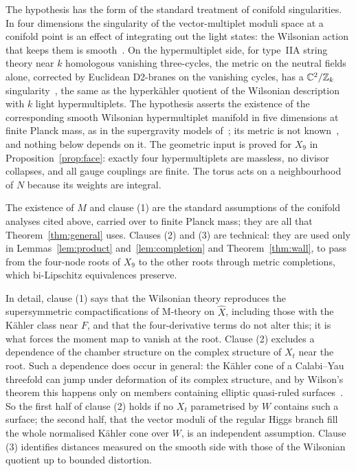 The hypothesis has the form of the standard treatment of conifold singularities. In four
dimensions the singularity of the vector-multiplet moduli space at a conifold point is an
effect of integrating out the light states: the Wilsonian action that keeps them is
smooth~\cite{Strominger:1995Conifold,Greene:1995hu}. On the hypermultiplet side, for type~IIA
string theory near $k$ homologous vanishing three-cycles, the metric on the neutral fields alone,
corrected by Euclidean D2-branes on the vanishing cycles, has a $\mathbb C^2/\mathbb Z_k$
singularity~\cite{OoguriVafa:1996,SeibergShenker:1996}, the same as the hyperk\"ahler quotient of
the Wilsonian description with $k$ light hypermultiplets. The hypothesis asserts the existence
of the corresponding smooth Wilsonian hypermultiplet manifold in five dimensions at finite Planck
mass, as in the supergravity models of~\cite{Mohaupt:2004de}; its metric is not
known~\cite{Mohaupt:2004de}, and nothing below depends on it. The geometric input is proved for $X_9$ in Proposition~\ref{prop:face}: exactly four hypermultiplets are massless, no
divisor collapses, and all gauge couplings are finite. The torus acts on a neighbourhood of $N$
because its weights are integral.

The existence of $M$ and clause (1) are the standard assumptions of the conifold analyses cited
above, carried over to finite Planck mass; they are all that Theorem~\ref{thm:general} uses.
Clauses (2) and (3) are technical: they are used only in Lemmas~\ref{lem:product}
and~\ref{lem:completion} and Theorem~\ref{thm:wall}, to pass from the four-node roots of $X_9$ to
the other roots through metric completions, which bi-Lipschitz equivalences preserve.

In detail, clause (1) says that the Wilsonian theory reproduces the
supersymmetric compactifications of M-theory on $\widehat X$, including those with the K\"ahler
class near $F$, and that the four-derivative terms do not alter this; it is what forces the
moment map to vanish at the root. Clause (2) excludes a dependence of the chamber structure on
the complex structure of $X_t$ near the root. Such a dependence does occur in general: the
K\"ahler cone of a Calabi--Yau threefold can jump under deformation of its complex structure,
and by Wilson's theorem this happens only on members containing elliptic quasi-ruled
surfaces~\cite{Wilson:1992,Wilson:1993}. So the first half of clause (2) holds if no $X_t$
parametrised by $W$ contains such a surface; the second half, that the vector moduli of the
regular Higgs branch fill the whole normalised K\"ahler cone over $W$, is an independent
assumption. Clause (3) identifies distances measured on the smooth side with those of the
Wilsonian quotient up to bounded distortion.

